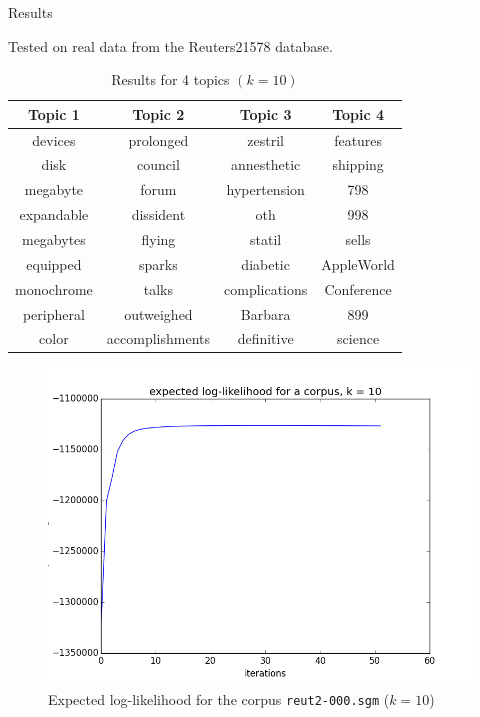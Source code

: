 \documentclass[final]{beamer}
\newlength{\onecolwid}
\begin{document}
\begin{frame}[t]
\begin{columns}[t]
\begin{column}{\onecolwid}
\begin{block}{Results}

Tested on real data from the Reuters21578 database.

\begin{table}
\vspace{2ex}
\begin{footnotesize}
\begin{tabular}{c c c c}
\toprule
\textbf{Topic 1} & \textbf{Topic 2} & \textbf{Topic 3}  & \textbf{Topic 4}\\
\midrule
devices & prolonged & zestril & features \\
disk & council & annesthetic &  shipping  \\
megabyte & forum & hypertension & 798  \\
expandable & dissident & oth & 998  \\
megabytes & flying & statil & sells  \\
equipped &  sparks & diabetic & AppleWorld  \\
monochrome &talks & complications & Conference  \\
peripheral & outweighed & Barbara & 899  \\
color & accomplishments & definitive & science  \\
\bottomrule
\end{tabular}
\end{footnotesize}
\caption{Results for 4 topics $(k=10)$}
\end{table}

\begin{figure}[ht!]
\begin{center}
\includegraphics[width=0.5\linewidth]{../img/k=10/log_likelihood_corpus_k=10.png}
\caption{Expected log-likelihood for the corpus \texttt{reut2-000.sgm} ($k=10$)}
\end{center}
\end{figure}


\end{block}
\end{column}
\end{columns}
\end{frame}
\end{document}

